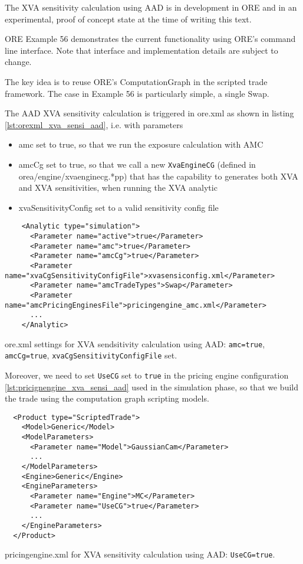 The XVA sensitivity calculation using AAD is in development in ORE and in an experimental,
proof of concept state at the time of writing this text.

ORE Example 56 demonstrates the current functionality using ORE's command line interface.
Note that interface and implementation details are subject to change.

The key idea is to reuse ORE's ComputationGraph in the scripted trade framework.
The case in Example 56 is particularly simple, a single Swap.

The AAD XVA sensitivity calculation is triggered in ore.xml as shown in listing
\ref{lst:orexml_xva_sensi_aad}, i.e. with parameters
\begin{itemize}
\item amc set to true, so that we run the exposure calculation with AMC
\item amcCg set to true, so that we call a new {\tt XvaEngineCG} (defined in
  orea/engine/xvaenginecg.*pp) that has the capability to generates both XVA and XVA sensitivities,
  when running the XVA analytic
\item xvaSensitivityConfig set to a valid sensitivity config file
\end{itemize}

\begin{listing}[hbt]
\begin{verbatim}
    <Analytic type="simulation">
      <Parameter name="active">true</Parameter>
      <Parameter name="amc">true</Parameter>
      <Parameter name="amcCg">true</Parameter>
      <Parameter name="xvaCgSensitivityConfigFile">xvasensiconfig.xml</Parameter>
      <Parameter name="amcTradeTypes">Swap</Parameter>
      <Parameter name="amcPricingEnginesFile">pricingengine_amc.xml</Parameter>
      ...
    </Analytic>
\end{verbatim}
\caption{ore.xml settings for XVA sendsitivity calculation using AAD: {\tt amc=true},
  {\tt amcCg=true}, {\tt xvaCgSensitivityConfigFile} set.}
\label{lst:orexml_xva_sensi_aad}
\end{listing}

Moreover, we need to set {\tt UseCG} set to {\tt true} in the pricing engine configuration
\ref{lst:pricignengine_xva_sensi_aad} used in the simulation phase,
so that we build the trade using the computation graph scripting models.

\begin{listing}[hbt]
\begin{verbatim}
  <Product type="ScriptedTrade">
    <Model>Generic</Model>
    <ModelParameters>
      <Parameter name="Model">GaussianCam</Parameter>
      ...
    </ModelParameters>
    <Engine>Generic</Engine>
    <EngineParameters>
      <Parameter name="Engine">MC</Parameter>
      <Parameter name="UseCG">true</Parameter>
      ...
    </EngineParameters>
  </Product>
\end{verbatim}
\caption{pricingengine.xml for XVA sensitivity calculation using AAD: {\tt UseCG=true}.}
\label{lst:pricignengine_xva_sensi_aad}
\end{listing}

